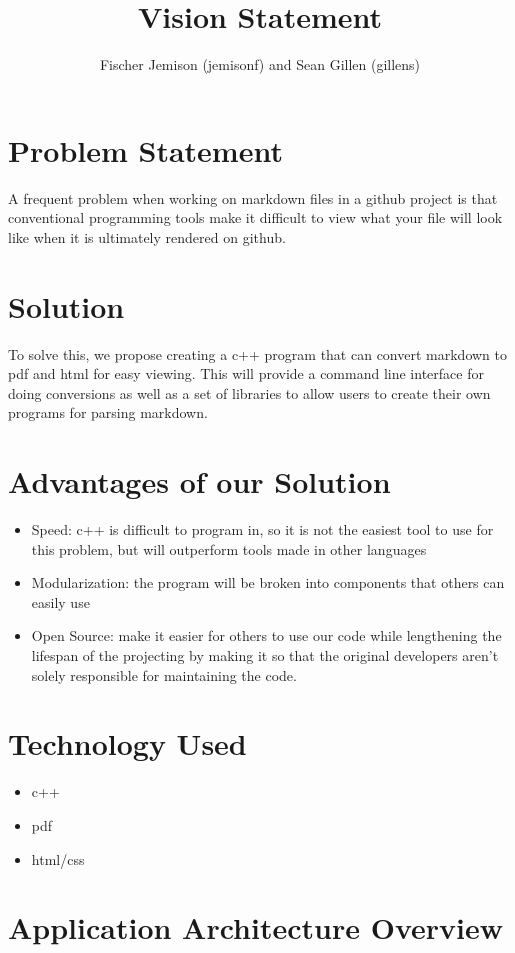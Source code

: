 \documentclass[12pt]{article}
\title{Vision Statement}
\author{Fischer Jemison (jemisonf) and Sean Gillen (gillens)}
\begin{document}
\maketitle
\tableofcontents


\section{Problem Statement}
A frequent problem when working on markdown files in a github project is that conventional programming tools make it difficult to view what your file will look like when it is ultimately rendered on github. 
\section{Solution}
To solve this, we propose creating a c++ program that can convert markdown to pdf and html for easy viewing. This will provide a command line interface for doing conversions as well as a set of libraries to allow users to create their own programs for parsing markdown.
\section{Advantages of our Solution}
\begin{itemize}
	\item Speed: c++ is difficult to program in, so it is not the easiest tool to use for this problem, but will outperform tools made in other languages
	\item Modularization: the program will be broken into components that others can easily use
	\item Open Source: make it easier for others to use our code while lengthening the lifespan of the projecting by making it so that the original developers aren't solely responsible for maintaining the code.
\end{itemize}
\section{Technology Used}
\begin{itemize}
	\item c++ 
	\item pdf
	\item html/css
\end{itemize}
\section{Application Architecture Overview}
\end{document}
